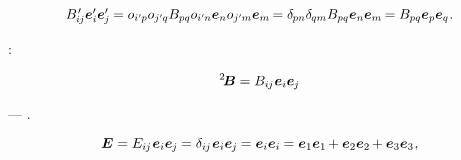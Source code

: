\nopagebreak\vspace{-0.2em}\begin{equation*}
\scalebox{0.98}[0.99]{$
B\hspace{.16ex}'_{\hspace{-0.32ex}i\hspace{-0.1ex}j} \bm{e}'_{i} \bm{e}'_{\hspace{-0.1ex}j} \hspace{-0.1ex}
= \cosinematrix{i'\hspace{-0.1ex}p} \cosinematrix{j'\hspace{-0.1ex}q} B_{pq} \cosinematrix{i'\hspace{-0.1ex}n} \bm{e}_n \cosinematrix{j'\hspace{-0.1ex}m} \bm{e}_m \hspace{-0.2ex}
= \delta_{\hspace{-0.1ex}pn} \delta_{\hspace{-0.1ex}qm} B_{pq} \bm{e}_n \bm{e}_m \hspace{-0.2ex}
= B_{pq} \bm{e}_p \bm{e}_q
$}
\hspace{.1ex} .
\end{equation*}

:    

\nopagebreak\vspace{-0.2em}\begin{equation}\label{polyada:2}
^2\!\bm{B} = B_{i\hspace{-0.1ex}j} \hspace{.1ex} \bm{e}_i \bm{e}_{\hspace{-0.1ex}j}
\end{equation}

\vspace{-0.25em}\nopagebreak\noindent
---  .

\vspace{-0.2em}  

\nopagebreak\vspace{-0.2em}\begin{equation*}
\bm{E} =
E_{i\hspace{-0.1ex}j} \hspace{.16ex} \bm{e}_i \bm{e}_{\hspace{-0.1ex}j} \hspace{-0.1ex} =
\delta_{i\hspace{-0.1ex}j} \hspace{.16ex} \bm{e}_i \bm{e}_{\hspace{-0.1ex}j} \hspace{-0.1ex} =
\bm{e}_i \bm{e}_i \hspace{-0.1ex} =
\bm{e}_1 \bm{e}_1 \hspace{-0.2ex} + \bm{e}_2 \bm{e}_2 \hspace{-0.2ex} + \bm{e}_3 \bm{e}_3
\hspace{.1ex} ,
\end{equation*}

